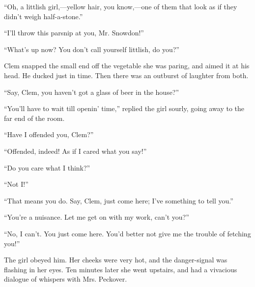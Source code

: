 ``Oh, a littlish girl,---yellow hair, you know,---one of them that look
as if they didn't weigh half-a-stone.''

``I'll throw this parsnip at you, Mr. Snowdon!''

``What's up now? You don't call yourself littlish, do you?''

Clem snapped the small end off the vegetable she was paring, and aimed
it at his head. He ducked just in time. Then there was an outburst of
laughter from both.

``Say, Clem, you haven't got a glass of beer in the house?''

``You'll have to wait till openin' time,'' replied the girl sourly,
going away to the far end of the room.

``Have I offended you, Clem?''

{}``Offended, indeed! As if I cared what you say!''

``Do you care what I think?''

``Not I!''

``That means you do. Say, Clem, just come here; I've something to tell
you.''

``You're a nuisance. Let me get on with my work, can't you?''

``No, I can't. You just come here. You'd better not give me the trouble
of fetching you!''

The girl obeyed him. Her cheeks were very hot, and the danger-signal was
flashing in her eyes. Ten minutes later she went upstairs, and had a
vivacious dialogue of whispers with Mrs. Peckover.
